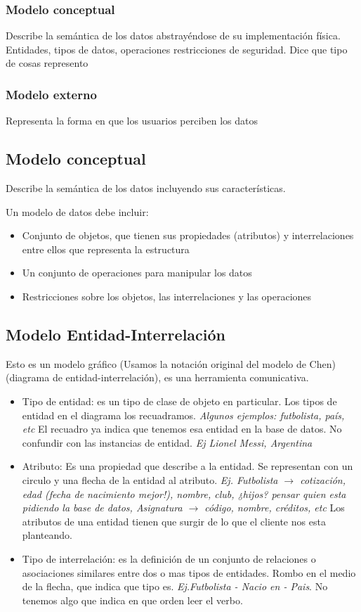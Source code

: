 \subsubsection*{Modelo conceptual}
Describe la semántica de los datos abstrayéndose de su implementación física. Entidades, tipos de datos, operaciones restricciones de seguridad. Dice que tipo de cosas represento

\subsubsection*{Modelo externo}
Representa la forma en que los usuarios perciben los datos


\subsection*{Modelo conceptual}
Describe la semántica de los datos incluyendo sus características.

Un modelo de datos debe incluir:
\begin{itemize}
\item Conjunto de objetos, que tienen sus propiedades (atributos) y interrelaciones entre ellos que representa la estructura
\item Un conjunto de operaciones para manipular los datos
\item Restricciones sobre los objetos, las interrelaciones y las operaciones
\end{itemize}

\subsection*{Modelo Entidad-Interrelación}

Esto es un modelo gráfico (Usamos la notación original del modelo de Chen)(diagrama de entidad-interrelación), es una herramienta comunicativa.

\begin{itemize}
\item Tipo de entidad: es un tipo de clase de objeto en particular. Los tipos de entidad en el diagrama los recuadramos. \textit{Algunos ejemplos: futbolista, país, etc} El recuadro ya indica que tenemos esa entidad en la base de datos. No confundir con las instancias de entidad. \textit{Ej Lionel Messi, Argentina}
\item Atributo: Es una propiedad que describe a la entidad. Se representan con un circulo y una flecha de la entidad al atributo. \textit{Ej. Futbolista $\rightarrow$ cotización, edad (fecha de nacimiento mejor!), nombre, club, ¿hijos? pensar quien esta pidiendo la base de datos, Asignatura $\rightarrow$ código, nombre, créditos, etc} Los atributos de una entidad tienen que surgir de lo que el cliente nos esta planteando. 
\item Tipo de interrelación: es la definición de un conjunto de relaciones o asociaciones similares entre dos o mas tipos de entidades.
Rombo en el medio de la flecha, que indica que tipo es. \textit{Ej.Futbolista -  Nacio en - Pais}. No tenemos algo que indica en que orden leer el verbo.
\end{itemize}

